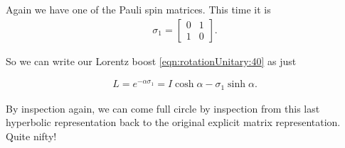 Again we have one of the Pauli spin matrices.  This time it is
\begin{align}\label{eqn:rotationUnitary:42}
\sigma_1 =
\begin{bmatrix}
0 & 1 \\
1 & 0 
\end{bmatrix}.
\end{align}

So we can write our Lorentz boost \ref{eqn:rotationUnitary:40} as just

\begin{align}\label{eqn:rotationUnitary:43}
L = e^{-\alpha \sigma_1} = I \cosh\alpha - \sigma_1 \sinh\alpha.
\end{align}

By inspection again, we can come full circle by inspection from this last hyperbolic representation back to the original explicit matrix representation.  Quite nifty!

\EndArticle
